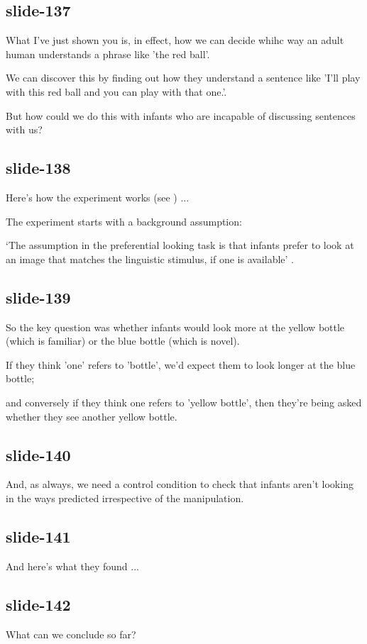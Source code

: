 \documentclass[12pt,\papersize]{extarticle}
\begin{document}
\subsection{slide-137}
What I've just shown you is, in effect, how we can decide whihc way an adult human understands a phrase like 'the red ball'.

We can discover this by finding out how they understand a sentence like 'I’ll play with this red ball and you can play with that one.'.

But how could we do this with infants who are incapable of discussing sentences with us?

\subsection{slide-138}
Here's how the experiment works (see \citealp{lidz:2003_what}) ...

The experiment starts with a background assumption:

‘The assumption in the preferential looking task is that infants prefer to look at an image that matches the linguistic stimulus, if one is available’ \citep{lidz:2003_what}.

\subsection{slide-139}
So the key question was whether infants would look more at the yellow bottle (which is familiar) or the blue bottle (which is novel).

If they think 'one' refers to 'bottle', we'd expect them to look longer at the blue bottle;

and conversely if they think one refers to 'yellow bottle', then they're being asked whether they see another yellow bottle.

\subsection{slide-140}
And, as always, we need a control condition to check that infants aren't looking in the ways predicted irrespective of the manipulation.

\subsection{slide-141}
And here's what they found ...

\subsection{slide-142}
What can we conclude so far?
\end{document}
